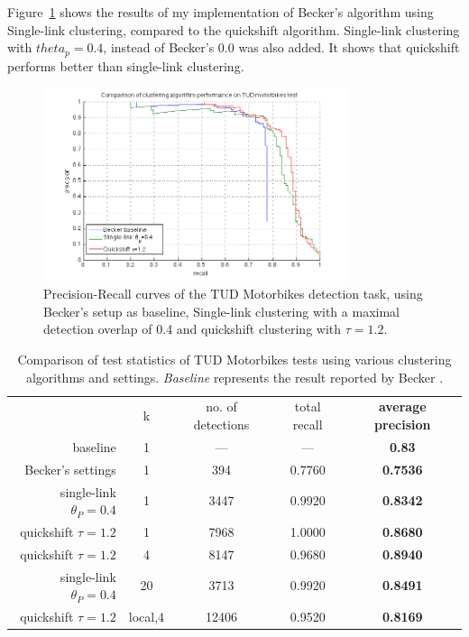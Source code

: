 Figure~\ref{fig:tudk1clusteralgos} shows the results of my implementation of Becker's algorithm using Single-link clustering, compared to the quickshift algorithm. Single-link clustering with $theta_p = 0.4$, instead of Becker's $0.0$ was also added. It shows that quickshift performs better than single-link clustering.

\begin{figure}[hbt]
    \centering
    \includegraphics[width=0.8\textwidth]{TUD_k1_clusteralgs}
    \caption{Precision-Recall curves of the TUD Motorbikes detection task, using Becker's \cite{becker2012codebook} setup as baseline, Single-link clustering with a maximal detection overlap of 0.4 and quickshift clustering with $\tau = 1.2$.}
    \label{fig:tudk1clusteralgos}
\end{figure}

\begin{table}
    \caption{Comparison of test statistics of TUD Motorbikes tests using various clustering algorithms and settings. \emph{Baseline} represents the result reported by Becker \cite{becker2012codebook}.}
    \label{tab:tudk1clusteralgos}
    \begin{tabular}{rc|cc>{\bfseries}c}
        ~&k&no. of detections&total recall&average precision \\
        baseline & 1 & --- & --- & 0.83 \\
        Becker's settings & 1 & 394 & 0.7760 & 0.7536\\
        single-link $\theta_P=0.4$ & 1 & 3447 & 0.9920 & 0.8342\\
        quickshift $\tau=1.2$ & 1 & 7968 & 1.0000 & 0.8680\\
        quickshift $\tau=1.2$ & 4 & 8147 & 0.9680 & 0.8940\\
        single-link $\theta_P=0.4$ & 20 & 3713 & 0.9920 & 0.8491\\
        quickshift $\tau=1.2$ & local,4 & 12406 & 0.9520 & 0.8169
    \end{tabular}

\end{table}


